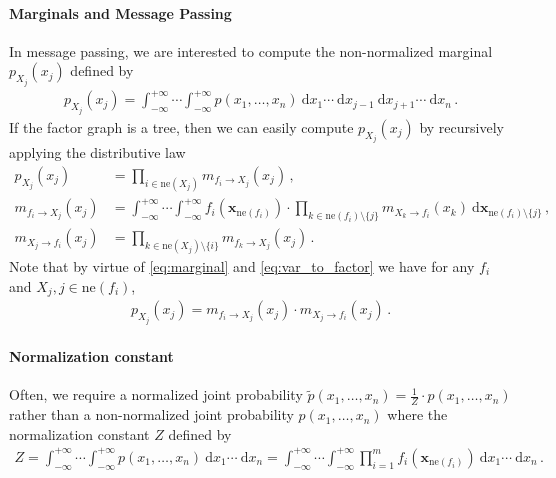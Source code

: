 \documentclass[a4paper]{article}
\newcommand{\bs}[1]{{\boldsymbol{#1}}}
\newcommand{\intd}[1]{\ \mathrm{d}{#1}}
\newcommand{\neighbours}[1]{{\mathrm{ne} \left( {#1} \right)}}
\theoremstyle{definition}
\begin{document}
\paragraph{Marginals and Message Passing} In message passing, we are interested to compute the non-normalized marginal $p_{X_j}(x_j)$ defined by
\begin{align}
    p_{X_j}(x_j) = \int_{-\infty}^{+\infty} \cdots \int_{-\infty}^{+\infty} p(x_1,\ldots,x_n) \intd{x_1} \cdots \intd{x_{j-1}} \intd{x_{j+1}} \cdots \intd{x_n} \,. \label{eq:marginal_def}
\end{align}
If the factor graph is a tree, then we can easily compute $p_{X_j}(x_j)$ by recursively applying the distributive law
\begin{align}
    p_{X_j} (x_j)        & = \prod_{i \in \neighbours{X_j}} m_{f_i \to X_j}(x_j) \,, \label{eq:marginal}                                                                                                                                                                     \\
    m_{f_i \to X_j}(x_j) & = \int_{-\infty}^{+\infty} \cdots \int_{-\infty}^{+\infty} f_i(\bs{x}_{\neighbours{f_i}}) \cdot \prod_{k \in \neighbours{f_i} \setminus \{j\}} m_{X_k \to f_i}(x_k) \intd{\bs{x}_{\neighbours{f_i} \setminus \{j\}}} \,, \label{eq:factor_to_var} \\
    m_{X_j \to f_i}(x_j) & = \prod_{k \in \neighbours{X_j} \setminus \{i\}} m_{f_k \to X_j}(x_j) \,. \label{eq:var_to_factor}
\end{align}
Note that by virtue of \eqref{eq:marginal} and \eqref{eq:var_to_factor} we have for any $f_i$ and $X_j, j\in \neighbours{f_i}$,
\begin{align}
    p_{X_j}(x_j) = m_{f_i \to X_j}(x_j) \cdot m_{X_j \to f_i}(x_j)\,. \label{eq:marginal_factor}
\end{align}

\paragraph{Normalization constant} Often, we require a normalized joint probability $\widetilde{p}(x_1,\ldots,x_n) = \frac{1}{Z} \cdot p(x_1,\ldots,x_n)$ rather than a non-normalized joint probability $p(x_1,\ldots,x_n)$ where the normalization constant $Z$ defined by
\begin{align}
    Z = \int_{-\infty}^{+\infty} \cdots \int_{-\infty}^{+\infty} p(x_1,\ldots,x_n) \intd{x_1} \cdots \intd{x_n} = \int_{-\infty}^{+\infty} \cdots \int_{-\infty}^{+\infty}  \prod_{i=1}^m f_i(\bs{x}_{\neighbours{f_i}}) \intd{x_1} \cdots \intd{x_n} \,. \label{eq:partition}
\end{align}
\end{document}

